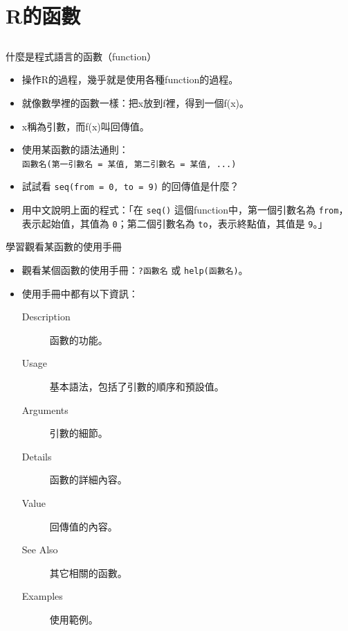 \documentclass[12pt]{beamer}
\begin{document}
\section{R的函數}\subsection{}

\begin{frame}[fragile]{什麼是程式語言的函數（function）}
\begin{itemize}
\item 操作R的過程，幾乎就是使用各種function的過程。
\item 就像數學裡的函數一樣：把x放到f裡，得到一個f(x)。
\item x稱為引數，而f(x)叫回傳值。
\item 使用某函數的語法通則： \\ \verb+函數名(第一引數名 = 某值, 第二引數名 = 某值, ...)+ 
\item 試試看 \verb+seq(from = 0, to = 9)+ 的回傳值是什麼？
\item 用中文說明上面的程式：「在 \verb+seq()+ 這個function中，第一個引數名為 \verb+from+，表示起始值，其值為 \verb+0+；第二個引數名為 \verb+to+，表示終點值，其值是 \verb+9+。」
\end{itemize}
\end{frame}



\begin{frame}[fragile]{學習觀看某函數的使用手冊}
\begin{itemize}
\item 觀看某個函數的使用手冊：\verb+?函數名+ 或 \verb+help(函數名)+。
\item 使用手冊中都有以下資訊：
\begin{description}
	\item [Description] 函數的功能。
	\item [Usage] 基本語法，包括了引數的順序和預設值。
	\item [Arguments] 引數的細節。
	\item [Details] 函數的詳細內容。
	\item [Value] 回傳值的內容。
	\item [See Also] 其它相關的函數。
	\item [Examples] 使用範例。
\end{description}
\end{itemize}
\end{frame}
\end{document}
